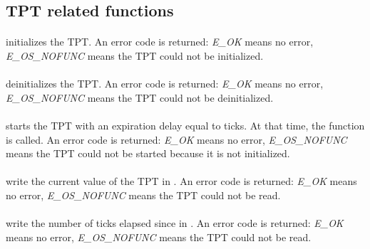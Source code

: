 \subsection{TPT related functions}

\paragraph{} initializes the TPT. An error code is returned: {\em E\_OK} means no error, {\em E\_OS\_NOFUNC} means the TPT could not be initialized.

\paragraph{} deinitializes the TPT. An error code is returned: {\em E\_OK} means no error, {\em E\_OS\_NOFUNC} means the TPT could not be deinitialized.

\paragraph{} starts the TPT with an expiration delay equal to  ticks. At that time, the  function is called. An error code is returned: {\em E\_OK} means no error, {\em E\_OS\_NOFUNC} means the TPT could not be started because it is not initialized.

\paragraph{} write the current value of the TPT in . An error code is returned: {\em E\_OK} means no error, {\em E\_OS\_NOFUNC} means the TPT could not be read.

\paragraph{} write the number of ticks elapsed since  in . An error code is returned: {\em E\_OK} means no error, {\em E\_OS\_NOFUNC} means the TPT could not be read.

